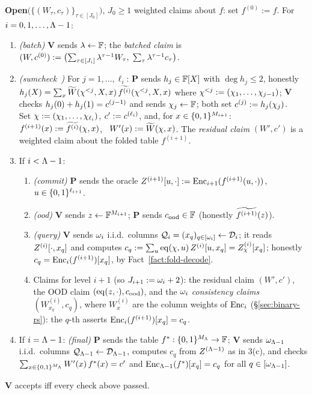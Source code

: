 \begin{protocol}
\smallskip
\textbf{Open}$\bigl(\{(W_\tau, c_\tau)\}_{\tau \in [J_0]}\bigr)$, $J_0 \ge 1$ weighted claims about $f$: set $f^{(0)} := f$. For $i = 0, 1, \dots, \Lambda - 1$:
\begin{enumerate}[itemsep=0.5pt,topsep=2pt]
\item \emph{(batch)} $\mathbf{V}$ sends $\lambda \leftarrow \mathbb{F}$; the \emph{batched claim} is $(W, c^{(0)}) := \bigl(\sum_{\tau \in [J_i]} \lambda^{\tau-1} W_\tau,\; \sum_{\tau} \lambda^{\tau-1} c_\tau\bigr)$.
\item \emph{(sumcheck~\cite{LFKN92})} For $j = 1, \dots, \ell_i$: $\mathbf{P}$ sends $h_j \in \mathbb{F}[X]$ with $\deg h_j \le 2$, honestly $h_j(X) = \sum_{x} \widetilde{W}(\chi^{<j}, X, x)\, \widetilde{f^{(i)}}(\chi^{<j}, X, x)$ where $\chi^{<j} := (\chi_1, \dots, \chi_{j-1})$; $\mathbf{V}$ checks $h_j(0) + h_j(1) = c^{(j-1)}$ and sends $\chi_j \leftarrow \mathbb{F}$; both set $c^{(j)} := h_j(\chi_j)$.\\
Set $\chi := (\chi_1, \dots, \chi_{\ell_i})$, $c' := c^{(\ell_i)}$, and, for $x \in \{0,1\}^{M_{i+1}}$: \ $f^{(i+1)}(x) := \widetilde{f^{(i)}}(\chi, x)$, \ $W'(x) := \widetilde{W}(\chi, x)$. The \emph{residual claim} $(W', c')$ is a weighted claim about the folded table $f^{(i+1)}$.
\item If $i < \Lambda - 1$:
\begin{enumerate}[itemsep=0.5pt,topsep=1pt,label=(\alph*)]
\item \emph{(commit)} $\mathbf{P}$ sends the oracle $Z^{(i+1)}[u, \cdot] := \mathrm{Enc}_{i+1}(f^{(i+1)}(u, \cdot))$, $u \in \{0,1\}^{\ell_{i+1}}$.
\item \emph{(ood)} $\mathbf{V}$ sends $z \leftarrow \mathbb{F}^{M_{i+1}}$; $\mathbf{P}$ sends $c_{\mathrm{ood}} \in \mathbb{F}$ (honestly $\widetilde{f^{(i+1)}}(z)$).
\item \emph{(query)} $\mathbf{V}$ sends $\omega_i$ i.i.d.\ columns $\mathcal{Q}_i = (x_q)_{q \in [\omega_i]} \leftarrow \mathcal{D}_i$; it reads $Z^{(i)}[\cdot, x_q]$ and computes $c_q := \sum_{u} \operatorname{eq}(\chi, u)\, Z^{(i)}[u, x_q] = Z^{(i)}_\chi[x_q]$; honestly $c_q = \mathrm{Enc}_i(f^{(i+1)})[x_q]$, by Fact~\ref{fact:fold-decode}.
\item Claims for level $i+1$ (so $J_{i+1} := \omega_i + 2$): the residual claim $(W', c')$, the OOD claim $(\operatorname{eq}(z, \cdot), c_{\mathrm{ood}})$, and the $\omega_i$ \emph{consistency claims} $(W^{(i)}_{x_q}, c_q)$, where $W^{(i)}_x$ are the column weights of $\mathrm{Enc}_i$ (\S\ref{sec:binary-rs}): the $q$-th asserts $\mathrm{Enc}_i(f^{(i+1)})[x_q] = c_q$.
\end{enumerate}
\item If $i = \Lambda - 1$: \emph{(final)} $\mathbf{P}$ sends the table $f^{\ast} : \{0,1\}^{M_\Lambda} \to \mathbb{F}$; $\mathbf{V}$ sends $\omega_{\Lambda-1}$ i.i.d.\ columns $\mathcal{Q}_{\Lambda-1} \leftarrow \mathcal{D}_{\Lambda-1}$, computes $c_q$ from $Z^{(\Lambda-1)}$ as in 3(c), and checks $\sum_{x \in \{0,1\}^{M_\Lambda}} W'(x)\, f^{\ast}(x) = c'$ and $\mathrm{Enc}_{\Lambda-1}(f^{\ast})[x_q] = c_q$ for all $q \in [\omega_{\Lambda-1}]$.
\end{enumerate}
$\mathbf{V}$ accepts iff every check above passed.
\end{protocol}

